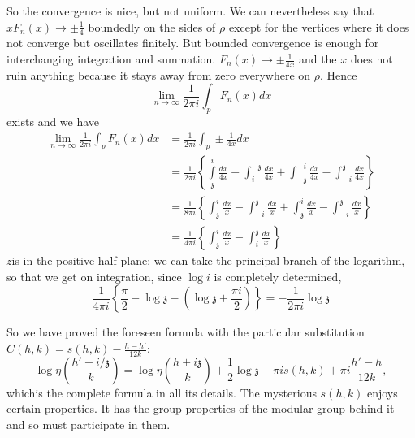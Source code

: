 So the convergence is nice, but not uniform. We can nevertheless say
that $xF_n (x) \to \pm \frac{1}{4}$ boundedly on the sides of $\rho$
except for the vertices where it does not converge but oscillates
finitely. But bounded convergence is enough for interchanging
integration and summation. $F_n (x) \to \pm \frac{1}{4x}$ and the $x$
does not ruin anything because it stays away from zero everywhere on
$\rho$. Hence
$$
\lim\limits_{n \to \infty} \frac{1}{2 \pi i} \int_p F_n (x) dx
$$
exists and we have
\begin{align*}
  \lim\limits_{n \to \infty} \frac{1}{2 \pi i} \int_p F_n (x) dx & =
  \frac{1}{2 \pi i} \int_p \pm \frac{1}{4x} dx\\
  & = \frac{1}{2 \pi i} \left\{ \int\limits_{\mathfrak{z}}^i \frac{dx}{4x} -
  \int^{-\mathfrak{z}}_{i} \frac{dx}{4x} + \int^{-i}_{-\mathfrak{z}}
  \frac{dx}{4x} - \int^{\mathfrak{z}}_{-i} \frac{dx}{4x} \right\}\\
  & = \frac{1}{8 \pi i} \left\{ \int^i_{\mathfrak{z}} \frac{dx}{x} -
  \int^{\mathfrak{z}}_{-i} \frac{dx}{x} + \int^i_{\mathfrak{z}}
  \frac{dx}{x} - \int^{\mathfrak{z}}_{-i} \frac{dx}{x}\right\}\\
  & = \frac{1}{4 \pi i} \left\{ \int^i_{\mathfrak{z}} \frac{dx}{x} -
  \int^{\mathfrak{z}}_i  \frac{dx}{x}\right\}
\end{align*}
$z$\pageoriginale is in the positive half-plane; we can take the principal branch of
  the logarithm, so that we get on integration, since $\log i$ is
  completely determined,
$$
    \frac{1}{4 \pi i}  \left\{  \frac{\pi}{2} - \log \mathfrak{z} - \left(
    \log \mathfrak{z} + \frac{\pi i}{2}\right)\right\} 
     = - \frac{1}{2 \pi i} \log \mathfrak{z}
$$

    \begin{figure}[H]
    \end{figure}


So we have proved the foreseen formula with the particular
substitution $C (h, k)= s(h, k)- \frac{h-h'}{12k}$:
$$
\log \eta \left( \frac{h'+ i/\mathfrak{z}}{k}\right) = \log \eta
\left(\frac{h + i \mathfrak{z}}{k} \right)+ \frac{1}{2} \log
\mathfrak{z} + \pi i s(h, k) + \pi i \frac{h'-h}{12k},
$$
which\pageoriginale is the complete formula in all its details. The
mysterious $s(h, k)$ enjoys certain properties. It has the group
properties of the modular group behind it and so must participate in
them. 


